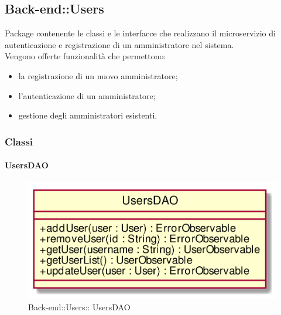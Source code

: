 \subsection{Back-end::Users}
Package contenente le classi e le interfacce che realizzano il microservizio di autenticazione e registrazione di un amministratore nel sistema.\\
Vengono offerte funzionalità che permettono:
\begin{itemize}
\item la registrazione di un nuovo amministratore;
\item l'autenticazione di un amministratore;
\item gestione degli amministratori esistenti.
\end{itemize}

\subsubsection{Classi}
\hypertarget{ UsersDAO_label}{\paragraph{ UsersDAO}}
\begin{figure}[h]
	\centering
	\includegraphics[width=\textwidth,height=\textheight,keepaspectratio]{images/Class_UsersDAO.png}
	\caption{Back-end::Users:: UsersDAO}
\end{figure}
